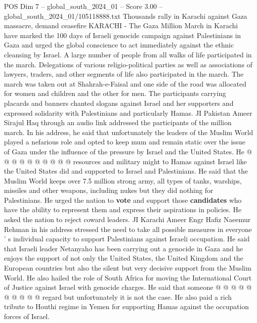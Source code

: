 \begin{textsample}{POS Dim 7 – global\_south\_2024\_01 – Score 3.00 – global\_south\_2024\_01/105118888.txt}  \label{ex:f7_pos_316}
Thousands rally in Karachi against Gaza massacre, demand ceasefire KARACHI - The Gaza Million March in Karachi have marked the 100 days of Israeli genocide campaign against Palestinians in Gaza and urged the global conscience to act immediately against the ethnic cleansing by Israel.
A large number of people from all walks of life participated in the march.
Delegations of various religio-political parties as well as associations of lawyers, traders, and other segments of life also participated in the march.
The march was taken out at Shahrah-e-Faisal and one side of the road was allocated for women and children and the other for men.
The participants carrying placards and banners chanted slogans against Israel and her supporters and expressed solidarity with Palestinians and particularly Hamas.
JI Pakistan Ameer Sirajul Haq through an audio link addressed the participants of the million march.
In his address, he said that unfortunately the leaders of the Muslim World played a nefarious role and opted to keep mum and remain static over the issue of Gaza under the influence of the pressure by Israel and the United States.
He @ @ @ @ @ @ @ @ @ @ resources and military might to Hamas against Israel like the United States did and supported to Israel and Palestinians.
He said that the Muslim World keeps over 7.5 million strong army, all types of tanks, warships, missiles and other weapons, including nukes but they did nothing for Palestinians.
He urged the nation to \textbf{vote} and support those \textbf{candidates} who have the ability to represent them and express their aspirations in policies.
He asked the nation to reject coward leaders.
JI Karachi Ameer Engr Hafiz Naeemur Rehman in his address stressed the need to take all possible measures in everyone ' s individual capacity to support Palestinians against Israeli occupation.
He said that Israeli leader Netanyaho has been carrying out a genocide in Gaza and he enjoys the support of not only the United States, the United Kingdom and the European countries but also the silent but very decisive support from the Muslim World.
He also hailed the role of South Africa for moving the International Court of Justice against Israel with genocide charges.
He said that someone @ @ @ @ @ @ @ @ @ @ regard but unfortunately it is not the case.
He also paid a rich tribute to Houthi regime in Yemen for supporting Hamas against the occupation forces of Israel.

\end{textsample}
